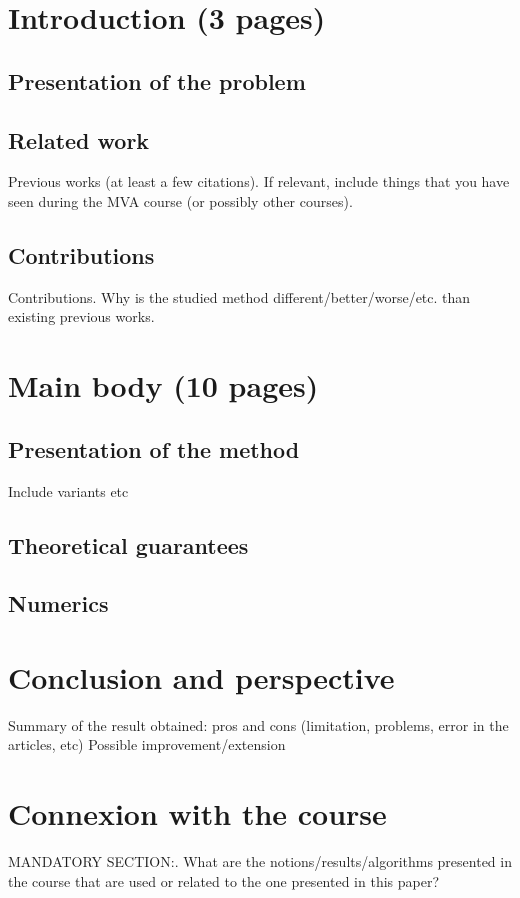 \section{Introduction (3 pages)}

\subsection{Presentation of the problem}

\subsection{Related work}
Previous works (at least a few citations). If relevant, include things that you have seen during the MVA course (or possibly other courses). 

\subsection{Contributions}
Contributions. Why is the studied method different/better/worse/etc. than existing previous works. 

\section{Main body (10 pages)}

\subsection{Presentation of the method}
Include variants etc

\subsection{Theoretical guarantees}

\subsection{Numerics}

\section{Conclusion and perspective}

Summary of the result obtained: pros and cons (limitation, problems, error in the articles, etc)
Possible improvement/extension

\section{Connexion with the course}

MANDATORY SECTION:. What are the notions/results/algorithms presented in the course that are used or related to the one presented in this paper?




